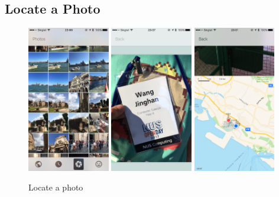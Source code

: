 \documentclass[12pt,a4paper]{article}
\begin{document}
        \subsection{Locate a Photo} %
            \label{sec:locate-photo}
            \begin{figure}[H]
                \includegraphics[width=0.32\textwidth]{4-1-6-a}
                \includegraphics[width=0.32\textwidth]{4-1-6-b}
                \includegraphics[width=0.32\textwidth]{4-1-6-c}
                \centering
                \caption{Locate a photo}
                \label{fig:locate-photo}
            \end{figure}
            
\end{document}
